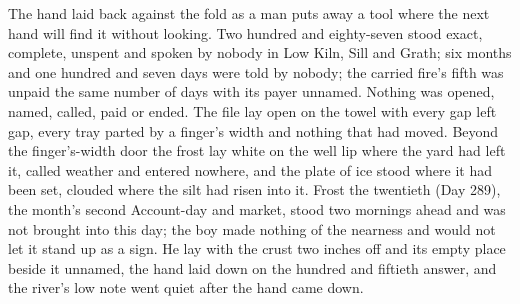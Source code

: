 The hand laid back against the fold as a man puts away a tool where the next hand will find it without looking. Two hundred and eighty-seven stood exact, complete, unspent and spoken by nobody in Low Kiln, Sill and Grath; six months and one hundred and seven days were told by nobody; the carried fire's fifth was unpaid the same number of days with its payer unnamed. Nothing was opened, named, called, paid or ended. The file lay open on the towel with every gap left gap, every tray parted by a finger's width and nothing that had moved. Beyond the finger's-width door the frost lay white on the well lip where the yard had left it, called weather and entered nowhere, and the plate of ice stood where it had been set, clouded where the silt had risen into it. Frost the twentieth (Day 289), the month's second Account-day and market, stood two mornings ahead and was not brought into this day; the boy made nothing of the nearness and would not let it stand up as a sign. He lay with the crust two inches off and its empty place beside it unnamed, the hand laid down on the hundred and fiftieth answer, and the river's low note went quiet after the hand came down.
